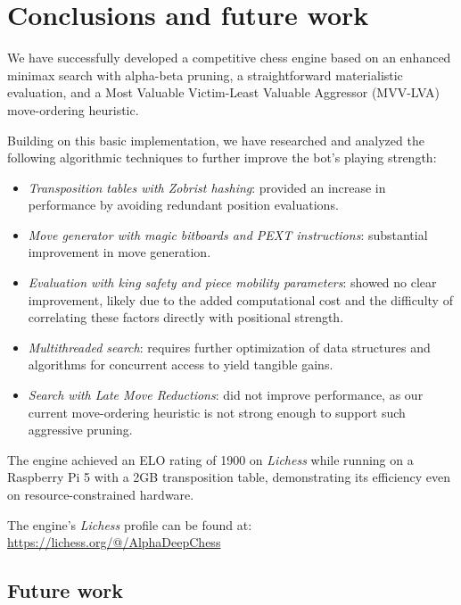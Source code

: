 \chapter{Conclusions and future work}

We have successfully developed a competitive chess engine based on an enhanced minimax search with alpha-beta pruning, a straightforward materialistic evaluation, and a Most Valuable Victim-Least Valuable Aggressor (MVV-LVA) move-ordering heuristic.

\vspace{1em}

\noindent Building on this basic implementation, we have researched and analyzed the following algorithmic techniques to further improve the bot's playing strength:

\begin{itemize}[itemsep=1pt]
    \item \textit{Transposition tables with Zobrist hashing}: provided an increase in performance by avoiding redundant position evaluations.
    \item \textit{Move generator with magic bitboards and PEXT instructions}: substantial improvement in move generation.
    \item \textit{Evaluation with king safety and piece mobility parameters}: showed no clear improvement, likely due to the added computational cost and the difficulty of correlating these factors directly with positional strength.
    \item \textit{Multithreaded search}: requires further optimization of data structures and algorithms for concurrent access to yield tangible gains.
    \item \textit{Search with Late Move Reductions}: did not improve performance, as our current move-ordering heuristic is not strong enough to support such aggressive pruning.
\end{itemize}

\noindent The engine achieved an ELO rating of 1900 on \textit{Lichess} while running on a Raspberry Pi 5 with a 2GB transposition table, demonstrating its efficiency even on resource-constrained hardware.

\vspace{1em}

\noindent The engine's \textit{Lichess} profile can be found at:\\
\url{https://lichess.org/@/AlphaDeepChess}


\newpage
\section{Future work}

